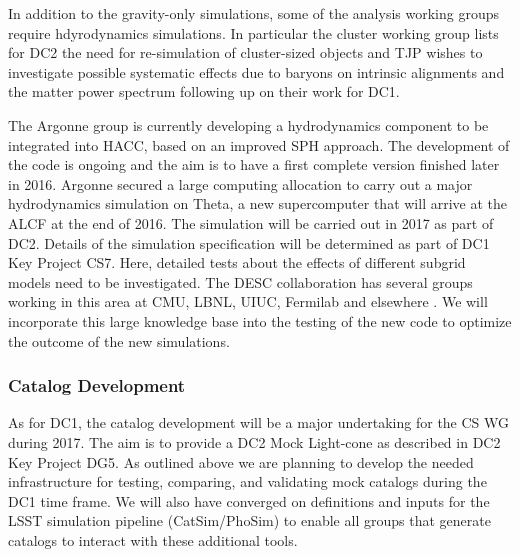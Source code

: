In addition to the gravity-only simulations, some of the analysis working groups require hdyrodynamics simulations. In particular the cluster working group lists for DC2 the need for re-simulation of cluster-sized objects and TJP wishes to investigate possible systematic effects due to baryons on intrinsic alignments and the matter power spectrum following up on their work for DC1.

The Argonne group is currently developing a hydrodynamics component to be integrated into HACC, based on an improved SPH approach. The development of the code is ongoing and the aim is to have a first complete version finished later in 2016. Argonne secured a large computing allocation to carry out a major hydrodynamics simulation on Theta, a new supercomputer that will arrive at the ALCF at the end of 2016. The simulation will be carried out in 2017 as part of DC2. Details of the simulation specification will be determined as part of DC1 Key Project CS7. Here, detailed tests about the effects of different subgrid models need to be investigated. The DESC collaboration has several groups working in this area at CMU, LBNL, UIUC, Fermilab and elsewhere . We will incorporate this large knowledge base into the testing of the new code to optimize the outcome of the new simulations.



\subsubsection{Catalog Development}
\label{sec:keysims:dc2:dev}

As for DC1, the catalog development will be a major undertaking for the CS WG during 2017. The aim is to provide a DC2 Mock Light-cone as described in DC2 Key Project DG5. As outlined above we are planning to develop the needed infrastructure for testing, comparing, and validating mock catalogs during the DC1 time frame. We will also have converged on definitions and inputs for the LSST simulation pipeline (CatSim/PhoSim) to enable all groups that generate catalogs to interact with these additional tools. 

